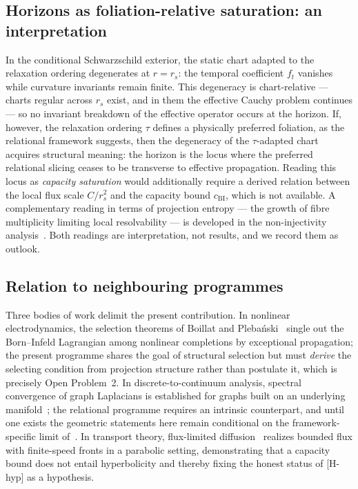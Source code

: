 \documentclass[epj]{svjour}
\begin{document}
  \subsection{Horizons as foliation-relative saturation: an interpretation}
    \label{subsec:horizon-outlook}

    In the conditional Schwarzschild exterior, the static chart adapted to the relaxation ordering
    degenerates at $r = r_s$: the temporal coefficient $f_t$ vanishes while curvature invariants
    remain finite.
    This degeneracy is chart-relative --- charts regular across $r_s$ exist, and in them the
    effective Cauchy problem continues --- so no invariant breakdown of the effective operator
    occurs at the horizon.
    If, however, the relaxation ordering $\tau$ defines a physically preferred foliation, as the
    relational framework suggests, then the degeneracy of the $\tau$-adapted chart acquires
    structural meaning: the horizon is the locus where the preferred relational slicing ceases to
    be transverse to effective propagation.
    Reading this locus as \emph{capacity saturation} would additionally require a derived relation
    between the local flux scale $C/r_s^2$ and the capacity bound $c_{\mathrm{BI}}$, which is not
    available.
    A complementary reading in terms of projection entropy --- the growth of fibre multiplicity
    limiting local resolvability --- is developed in the non-injectivity
    analysis~\cite{Beau2026b}.
    Both readings are interpretation, not results, and we record them as outlook.

  \subsection{Relation to neighbouring programmes}
    \label{subsec:positioning}

    Three bodies of work delimit the present contribution.
    In nonlinear electrodynamics, the selection theorems of Boillat and
    Pleba\'nski~\cite{Boillat1970,Plebanski1970} single out the Born--Infeld Lagrangian among
    nonlinear completions by exceptional propagation; the present programme shares the goal of
    structural selection but must
    \emph{derive} the selecting condition from projection structure rather than postulate it, which
    is precisely Open Problem~2.
    In discrete-to-continuum analysis, spectral convergence of graph Laplacians is established for
    graphs built on an underlying manifold~\cite{BelkinNiyogi2008,BuragoIvanovKurylev2014}; the
    relational programme requires an intrinsic counterpart, and until one exists the geometric
    statements here remain conditional on the framework-specific limit of~\cite{Beau2026a}.
    In transport theory, flux-limited diffusion~\cite{Rosenau1992} realizes bounded flux with
    finite-speed fronts in a parabolic setting, demonstrating that a capacity bound does not entail
    hyperbolicity and thereby fixing the honest status of [H-hyp] as a hypothesis.
\end{document}
